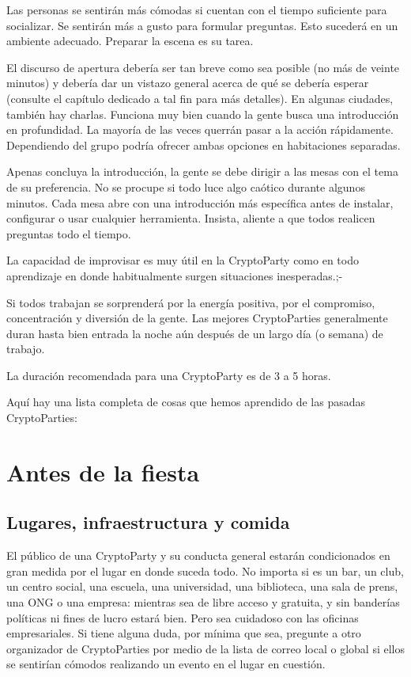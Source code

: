 \documentclass[10pt,a5paper,twoside,,]{book}
\begin{document}
Las personas se sentirán más cómodas si cuentan con el tiempo suficiente
para socializar. Se sentirán más a gusto para formular preguntas. Esto
sucederá en un ambiente adecuado. Preparar la escena es su tarea.

El discurso de apertura debería ser tan breve como sea posible (no más
de veinte minutos) y debería dar un vistazo general acerca de qué se
debería esperar (consulte el capítulo dedicado a tal fin para más
detalles). En algunas ciudades, también hay charlas. Funciona muy bien
cuando la gente busca una introducción en profundidad. La mayoría de las
veces querrán pasar a la acción rápidamente. Dependiendo del grupo
podría ofrecer ambas opciones en habitaciones separadas.

Apenas concluya la introducción, la gente se debe dirigir a las mesas
con el tema de su preferencia. No se procupe si todo luce algo caótico
durante algunos minutos. Cada mesa abre con una introducción más
específica antes de instalar, configurar o usar cualquier herramienta.
Insista, aliente a que todos realicen preguntas todo el tiempo.

La capacidad de improvisar es muy útil en la CryptoParty como en todo
aprendizaje en donde habitualmente surgen situaciones inesperadas.;-

Si todos trabajan se sorprenderá por la energía positiva, por el
compromiso, concentración y diversión de la gente. Las mejores
CryptoParties generalmente duran hasta bien entrada la noche aún después
de un largo día (o semana) de trabajo.

La duración recomendada para una CryptoParty es de 3 a 5 horas.

Aquí hay una lista completa de cosas que hemos aprendido de las pasadas
CryptoParties:

\section{Antes de la fiesta}\label{antes-de-la-fiesta}

\subsection{Lugares, infraestructura y
comida}\label{lugares-infraestructura-y-comida}

El público de una CryptoParty y su conducta general estarán
condicionados en gran medida por el lugar en donde suceda todo. No
importa si es un bar, un club, un centro social, una escuela, una
universidad, una biblioteca, una sala de prens, una ONG o una empresa:
mientras sea de libre acceso y gratuita, y sin banderías políticas ni
fines de lucro estará bien. Pero sea cuidadoso con las oficinas
empresariales. Si tiene alguna duda, por mínima que sea, pregunte a otro
organizador de CryptoParties por medio de la lista de correo local o
global si ellos se sentirían cómodos realizando un evento en el lugar en
cuestión.
\end{document}
